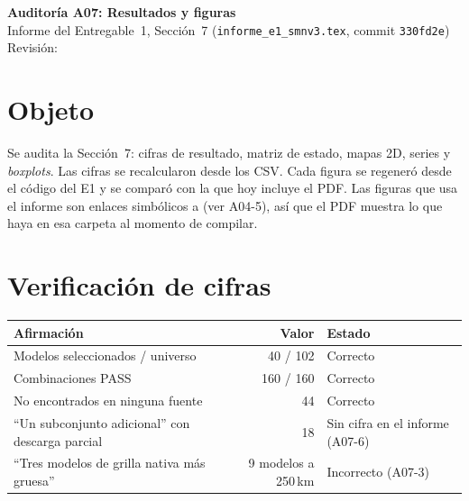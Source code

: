 \newcommand{\auditoriaid}{A07 -- Resultados y figuras}

\graphicspath{{../}}


\begin{center}
{\Large\bfseries Auditoría A07: Resultados y figuras}\\[0.4em]
{\normalsize Informe del Entregable~1, Sección~7 (\texttt{informe\_e1\_smnv3.tex}, commit \texttt{330fd2e})}\\[0.2em]
{\small Revisión: \fechaentrega}
\end{center}

\section{Objeto}

Se audita la Sección~7: cifras de resultado, matriz de estado, mapas 2D, series y \emph{boxplots}. Las cifras se recalcularon desde los CSV. Cada figura se regeneró desde el código del E1 y se comparó con la que hoy incluye el PDF. Las figuras que usa el informe son enlaces simbólicos a  (ver A04-5), así que el PDF muestra lo que haya en esa carpeta al momento de compilar.


\section{Verificación de cifras}

\begin{center}\small
\begin{tabular}{@{}lrl@{}}
\toprule
Afirmación & Valor & Estado \\
\midrule
Modelos seleccionados / universo & 40 / 102 & Correcto \\
Combinaciones PASS & 160 / 160 & Correcto \\
No encontrados en ninguna fuente & 44 & Correcto \\
``Un subconjunto adicional'' con descarga parcial & 18 & Sin cifra en el informe (A07-6) \\
``Tres modelos de grilla nativa más gruesa'' & 9 modelos a 250\,km & Incorrecto (A07-3) \\
\bottomrule
\end{tabular}
\end{center}

